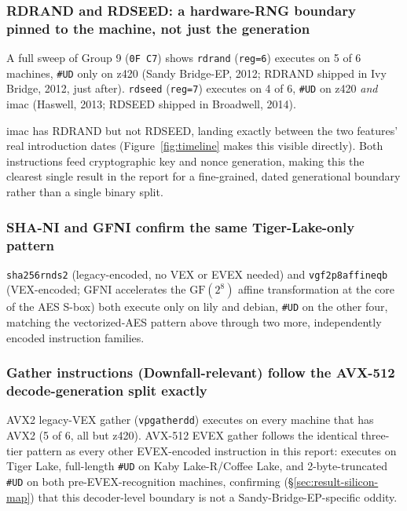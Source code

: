 \documentclass[11pt]{article}
\newcommand{\code}[1]{\texttt{#1}}
\begin{document}
\subsubsection{RDRAND and RDSEED: a hardware-RNG boundary pinned to the machine, not just the generation}

A full sweep of Group 9 (\code{0F C7}) shows \code{rdrand}
(\code{reg=6}) executes on 5 of 6 machines, \code{\#UD} only on z420
(Sandy Bridge-EP, 2012; RDRAND shipped in Ivy Bridge, 2012, just after).
\code{rdseed} (\code{reg=7}) executes on 4 of 6, \code{\#UD} on z420
\emph{and} imac (Haswell, 2013; RDSEED shipped in Broadwell, 2014).

imac has RDRAND but not RDSEED, landing exactly between the two
features' real introduction dates (Figure~\ref{fig:timeline} makes this
visible directly). Both instructions feed cryptographic key and nonce
generation, making this the clearest single result in the report for a
fine-grained, dated generational boundary rather than a single binary
split.

\subsubsection{SHA-NI and GFNI confirm the same Tiger-Lake-only pattern}

\code{sha256rnds2} (legacy-encoded, no VEX or EVEX needed) and
\code{vgf2p8affineqb} (VEX-encoded; GFNI accelerates the
$\mathrm{GF}(2^8)$ affine transformation at the core of the AES S-box)
both execute only on lily and debian, \code{\#UD} on the other four,
matching the vectorized-AES pattern above through two more, independently
encoded instruction families.

\subsubsection{Gather instructions (Downfall-relevant) follow the AVX-512 decode-generation split exactly}

AVX2 legacy-VEX gather (\code{vpgatherdd}) executes on every machine
that has AVX2 (5 of 6, all but z420). AVX-512 EVEX gather follows the
identical three-tier pattern as every other EVEX-encoded instruction in
this report: executes on Tiger Lake, full-length \code{\#UD} on Kaby
Lake-R/Coffee Lake, and 2-byte-truncated \code{\#UD} on both
pre-EVEX-recognition machines, confirming (\S\ref{sec:result-silicon-map})
that this decoder-level boundary is not a Sandy-Bridge-EP-specific
oddity.
\end{document}
